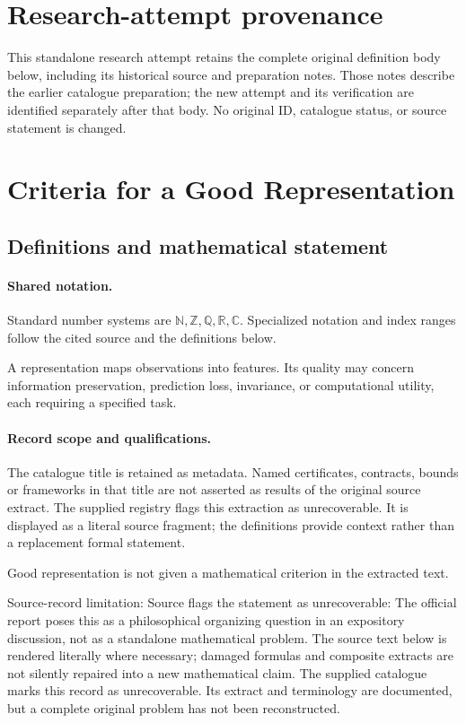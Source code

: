 \documentclass[11pt]{article}
\begin{document}
\section*{Research-attempt provenance}
This standalone research attempt retains the complete original definition body below,
including its historical source and preparation notes. Those notes describe the
earlier catalogue preparation; the new attempt and its verification are identified
separately after that body. No original ID, catalogue status, or source statement is changed.

\section{Criteria for a Good Representation}\label{statement}

\subsection{Definitions and mathematical statement}

\paragraph{Shared notation.}Standard number systems are $\mathbb N,\mathbb Z,\mathbb Q,\mathbb R,\mathbb C$. Specialized notation and index ranges follow the cited source and the definitions below.


A representation maps observations into features. Its quality may concern information preservation, prediction loss, invariance, or computational utility, each requiring a specified task.
\paragraph{Record scope and qualifications.}
The catalogue title is retained as metadata. Named certificates, contracts, bounds or frameworks in that title are not asserted as results of the original source extract.
The supplied registry flags this extraction as unrecoverable. It is displayed as a literal source fragment; the definitions provide context rather than a replacement formal statement.

Good representation is not given a mathematical criterion in the extracted text.

Source-record limitation: Source flags the statement as unrecoverable: The official report poses this as a philosophical organizing question in an expository discussion, not as a standalone mathematical problem.
The source text below is rendered literally where necessary; damaged formulas and composite extracts are not silently repaired into a new mathematical claim.
The supplied catalogue marks this record as unrecoverable. Its extract and terminology are documented, but a complete original problem has not been reconstructed.
\end{document}
